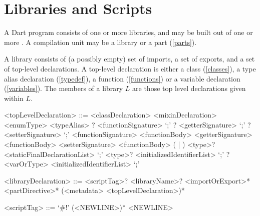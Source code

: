 \documentclass[makeidx]{article}
\begin{document}
{%





\section{Libraries and Scripts}

\LMHash{}%
A Dart program consists of one or more libraries, and may be built out of one or more .
A compilation unit may be a library or a part (\ref{parts}).

\LMHash{}%
A library consists of (a possibly empty) set of imports, a set of exports, and a set of top-level declarations.
A top-level declaration is either a class (\ref{classes}), a type alias declaration (\ref{typedef}), a function (\ref{functions}) or a variable declaration (\ref{variables}).
The members of a library $L$ are those top level declarations given within $L$.

\begin{grammar}
<topLevelDeclaration> ::= <classDeclaration>
  \alt <mixinDeclaration>
  \alt <enumType>
  \alt <typeAlias>
  \alt \EXTERNAL{}? <functionSignature> `;'
  \alt \EXTERNAL{}? <getterSignature> `;'
  \alt \EXTERNAL{}? <setterSignature> `;'
  \alt <functionSignature> <functionBody>
  \alt <getterSignature> <functionBody>
  \alt <setterSignature> <functionBody>
  \alt (\FINAL{} | \CONST{}) <type>? <staticFinalDeclarationList> `;'
  \alt \LATE{} \FINAL{} <type>? <initializedIdentifierList> `;'
  \alt \LATE{}? <varOrType> <initializedIdentifierList> `;'

<libraryDeclaration> ::= \gnewline{}
  <scriptTag>? <libraryName>? <importOrExport>* <partDirective>*
  \gnewline{} (<metadata> <topLevelDeclaration>)*

<scriptTag> ::= `#!' (\gtilde{}<NEWLINE>)* <NEWLINE>


\end{grammar}}
\end{document}
